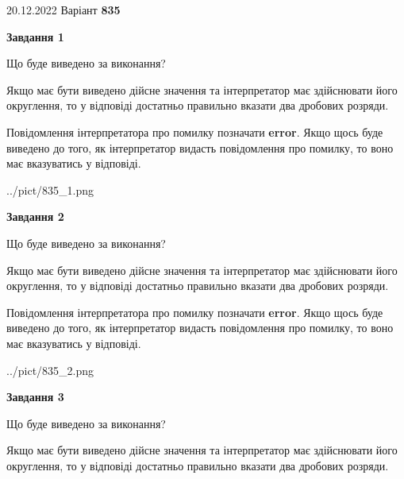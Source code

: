 \documentclass[12pt, ukrainian]{article}
\begin{document}
{20.12.2022 Варіант \No \textbf { 835 }\par}
{
\begin {Large}

{\begin {center}\textbf{Завдання 1}\end {center}}\par
Що буде виведено за виконання? \par

Якщо має бути виведено дійсне значення та інтерпретатор має здійснювати його округлення, 
то у відповіді достатньо правильно вказати два дробових розряди.

Повідомлення інтерпретатора про помилку позначати \textbf{error}.
Якщо щось буде виведено до того, як інтерпретатор видасть повідомлення про помилку, 
то воно має вказуватись у відповіді. \par

\begin{center}
	{../pict/835_1.png}
\end{center}
\newpage

{\begin {center}\textbf{Завдання 2}\end {center}}\par
Що буде виведено за виконання? \par

Якщо має бути виведено дійсне значення та інтерпретатор має здійснювати його округлення, 
то у відповіді достатньо правильно вказати два дробових розряди.

Повідомлення інтерпретатора про помилку позначати \textbf{error}.
Якщо щось буде виведено до того, як інтерпретатор видасть повідомлення про помилку, 
то воно має вказуватись у відповіді. \par

\begin{center}
	{../pict/835_2.png}
\end{center}
\newpage

{\begin {center}\textbf{Завдання 3}\end {center}}\par
Що буде виведено за виконання? \par

Якщо має бути виведено дійсне значення та інтерпретатор має здійснювати його округлення, 
то у відповіді достатньо правильно вказати два дробових розряди.


\end{Large}}
\end{document}
